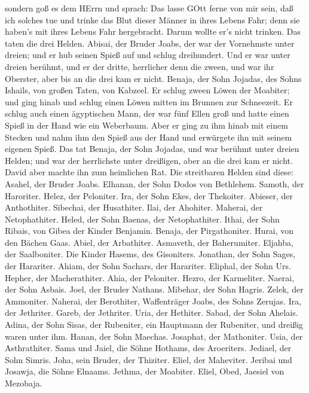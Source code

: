 sondern goß es dem HErrn  und sprach: Das lasse GOtt ferne
von mir sein, daß ich solches tue und trinke das Blut dieser Männer in
ihres Lebens Fahr; denn sie haben's mit ihres Lebens Fahr hergebracht.
Darum wollte er's nicht trinken. Das taten die drei Helden.
 Abisai, der Bruder Joabs, der war der Vornehmste unter
dreien; und er hub seinen Spieß auf und schlug dreihundert. Und er war
unter dreien berühmt,  und er der dritte, herrlicher denn
die zween, und war ihr Oberster, aber bis an die drei kam er nicht.
 Benaja, der Sohn Jojadas, des Sohns Ishails, von großen
Taten, von Kabzeel. Er schlug zween Löwen der Moabiter; und ging hinab
und schlug einen Löwen mitten im Brunnen zur Schneezeit. 
Er schlug auch einen ägyptischen Mann, der war fünf Ellen groß und hatte
einen Spieß in der Hand wie ein Weberbaum. Aber er ging zu ihm hinab mit
einem Stecken und nahm ihm den Spieß aus der Hand und erwürgete ihn mit
seinem eigenen Spieß.  Das tat Benaja, der Sohn Jojadas,
und war berühmt unter dreien Helden;  und war der
herrlichste unter dreißigen, aber an die drei kam er nicht. David aber
machte ihn zum heimlichen Rat.  Die streitbaren Helden sind
diese: Asahel, der Bruder Joabs. Elhanan, der Sohn Dodos von Bethlehem.
 Samoth, der Haroriter. Helez, der Peloniter. 
Ira, der Sohn Ekes, der Thekoiter. Abieser, der Anthothiter.
 Sibechai, der Husathiter. Ilai, der Ahohiter.
 Maherai, der Netophathiter. Heled, der Sohn Baenas, der
Netophathiter.  Ithai, der Sohn Ribais, von Gibea der
Kinder Benjamin. Benaja, der Pirgathoniter.  Hurai, von den
Bächen Gaas. Abiel, der Arbathiter.  Asmaveth, der
Baherumiter. Eljahba, der Saalboniter.  Die Kinder Hasems,
des Gisoniters. Jonathan, der Sohn Sages, der Harariter. 
Ahiam, der Sohn Sachars, der Harariter. Eliphal, der Sohn Urs.
 Hepher, der Macherathiter. Ahia, der Peloniter.
 Hezro, der Karmeliter. Naerai, der Sohn Asbais.
 Joel, der Bruder Nathans. Mibehar, der Sohn Hagris.
 Zelek, der Ammoniter. Naherai, der Berothiter,
Waffenträger Joabs, des Sohns Zerujas.  Ira, der Jethriter.
Gareb, der Jethriter.  Uria, der Hethiter. Sabad, der Sohn
Ahelais.  Adina, der Sohn Sisas, der Rubeniter, ein
Hauptmann der Rubeniter, und dreißig waren unter ihm. 
Hanan, der Sohn Maechas. Josaphat, der Mathoniter.  Usia,
der Asthrathiter. Sama und Jaiel, die Söhne Hothams, des Aroeriters.
 Jediael, der Sohn Simris. Joha, sein Bruder, der Thiziter.
 Eliel, der Maheviter. Jeribai und Josawja, die Söhne
Elnaams. Jethma, der Moabiter.  Eliel, Obed, Jaesiel von
Mezobaja.

